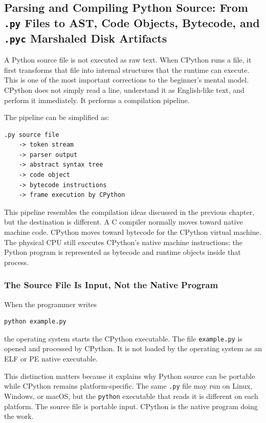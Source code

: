 \subsection{Parsing and Compiling Python Source: From \texttt{.py} Files to AST, Code Objects, Bytecode, and \texttt{.pyc} Marshaled Disk Artifacts}

A Python source file is not executed as raw text. When CPython runs a file, it first transforms that file into internal structures that the runtime can execute. This is one of the most important corrections to the beginner's mental model. CPython does not simply read a line, understand it as English-like text, and perform it immediately. It performs a compilation pipeline.

The pipeline can be simplified as:

\begin{verbatim}
.py source file
    -> token stream
    -> parser output
    -> abstract syntax tree
    -> code object
    -> bytecode instructions
    -> frame execution by CPython
\end{verbatim}

This pipeline resembles the compilation ideas discussed in the previous chapter, but the destination is different. A C compiler normally moves toward native machine code. CPython moves toward bytecode for the CPython virtual machine. The physical CPU still executes CPython's native machine instructions; the Python program is represented as bytecode and runtime objects inside that process.

\subsubsection{The Source File Is Input, Not the Native Program}

When the programmer writes

\begin{verbatim}
python example.py
\end{verbatim}

the operating system starts the CPython executable. The file \texttt{example.py} is opened and processed by CPython. It is not loaded by the operating system as an ELF or PE native executable.

This distinction matters because it explains why Python source can be portable while CPython remains platform-specific. The same \texttt{.py} file may run on Linux, Windows, or macOS, but the \texttt{python} executable that reads it is different on each platform. The source file is portable input. CPython is the native program doing the work.

